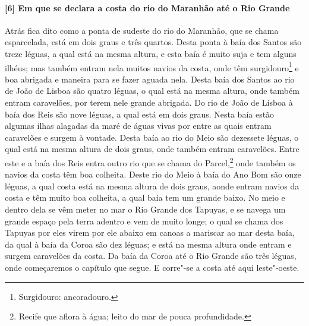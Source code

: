 \paragraph{[6] Em que se declara a costa do rio do Maranhão até o Rio Grande} \quad
Atrás fica dito como a ponta de sudeste do rio do Maranhão, que se chama esparcelada, está
em dois graus e três quartos. Desta ponta à baía dos Santos são treze léguas, a qual está
na mesma altura, e esta baía é muito suja e tem alguns ilhéus; mas também entram nela
muitos navios da costa, onde têm surgidouro\footnote{Surgidouro: ancoradouro.} e boa abrigada e maneira para se fazer aguada
nela. Desta baía dos Santos ao rio de João de Lisboa são quatro léguas, o qual está na
mesma altura, onde também entram caravelões, por terem nele grande abrigada. Do rio de
João de Lisboa à baía dos Reis são nove léguas, a qual está em dois graus. Nesta baía
estão algumas ilhas alagadas da maré de águas vivas por entre as quais entram caravelões e
surgem à vontade. Desta baía ao rio do Meio são dezessete léguas, o qual está na mesma
altura de dois graus, onde também entram caravelões. Entre este e a baía dos Reis entra
outro rio que se chama do Parcel,\footnote{ Recife que aflora à água; leito do mar de pouca
profundidade.} onde também os navios da costa têm boa colheita. Deste rio do Meio à baía
do Ano Bom são onze léguas, a qual costa está na mesma altura de dois graus, aonde entram
navios da costa e têm muito boa colheita, a qual baía tem um grande baixo. No meio e
dentro dela se vêm meter no mar o Rio Grande dos Tapuyas, e se navega um grande espaço
pela terra adentro e vem de muito longe; o qual se chama dos Tapuyas por eles virem por
ele abaixo em canoas a mariscar ao mar desta baía, da qual à baía da Coroa são dez léguas;
e está na mesma altura onde entram e surgem caravelões da costa. Da baía da Coroa até o
Rio Grande são três léguas, onde começaremos o capítulo que segue. E corre"-se a costa até
aqui leste"-oeste.


